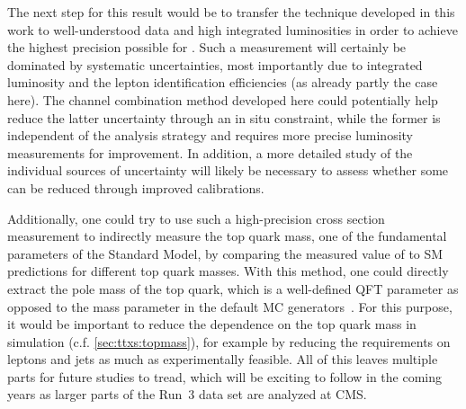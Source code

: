 The next step for this result would be to transfer the technique developed in this work to well-understood data and high integrated luminosities in order to achieve the highest precision possible for \sigmatt. Such a measurement will certainly be dominated by systematic uncertainties, most importantly due to integrated luminosity and the lepton identification efficiencies (as already partly the case here). 
The channel combination method developed here could potentially help reduce the latter uncertainty through an in situ constraint, while the former is independent of the analysis strategy and requires more precise luminosity measurements for improvement. In addition, a more detailed study of the individual sources of uncertainty will likely be necessary to assess whether some can be reduced through improved calibrations.

Additionally, one could try to use such a high-precision \ttbar cross section measurement to indirectly measure the top quark mass, one of the fundamental parameters of the Standard Model, by comparing the measured value of \sigmatt to SM predictions for different top quark masses. With this method, one could directly extract the pole mass of the top quark, which is a well-defined QFT parameter as opposed to the mass parameter in the default MC generators~\cite{Hoang:2020iah}. For this purpose, it would be important to reduce the dependence on the top quark mass in simulation (c.f. \cref{sec:ttxs:topmass}), for example by reducing the \pt requirements on leptons and jets as much as experimentally feasible. 
All of this leaves multiple parts for future studies to tread, which will be exciting to follow in the coming years as larger parts of the Run~3 data set are analyzed at CMS.

